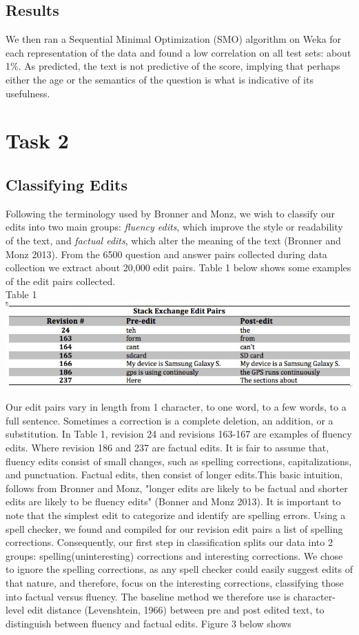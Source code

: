 \documentclass[11pt, oneside]{article}   	%
\begin{document}
\subsection{Results}
We then ran a Sequential Minimal Optimization (SMO) algorithm on Weka for each representation of the data and found a low correlation on all test sets: about 1\%. As predicted, the text is not predictive of the score, implying that perhaps either the age or the semantics of the question is what is indicative of its usefulness. 

\section{Task 2}
\subsection{Classifying Edits} 
Following the terminology used by Bronner and Monz, we wish to classify our edits into two main groups:{ \itshape fluency edits}, which improve the style or readability of the text, and {\itshape factual edits}, which alter the meaning of the text (Bronner and Monz 2013).   From the 6500 question and answer pairs collected during data collection we extract about 20,000 edit pairs.  Table 1 below shows some examples of the edit pairs collected. 
\\[.5cm]
\centering 
Table 1
\includegraphics[width=\textwidth]{table1-editpairs}


\raggedright
Our edit pairs vary in length from 1 character, to one word, to a few words, to a full sentence. Sometimes a correction is a complete deletion, an addition, or a substitution. In Table 1, revision 24 and revisions 163-167 are examples of fluency edits. Where revision 186 and 237 are factual edits. It is fair to assume that, fluency edits consist of small changes, such as spelling corrections, capitalizations, and punctuation. Factual edits, then consist of longer edits.This basic intuition, follows from Bronner and Monz, "longer edits are likely to be factual and shorter edits are likely to be fluency edits" (Bonner and Monz 2013). It is important to note that the simplest edit to categorize and identify are spelling errors. Using a spell checker, we found and compiled for our revision edit pairs a list of spelling corrections. Consequently, our first step in classification splits our data into 2 groups: spelling(uninteresting) corrections and interesting corrections. We chose to ignore the spelling corrections, as any spell checker could easily suggest edits of that nature, and therefore, focus on the interesting corrections, classifying those into factual versus fluency. The baseline method we therefore use is character-level edit distance (Levenshtein, 1966) between pre and post edited text, to distinguish between fluency and factual edits. Figure 3 below shows  
\\[.5cm]
\end{document}
